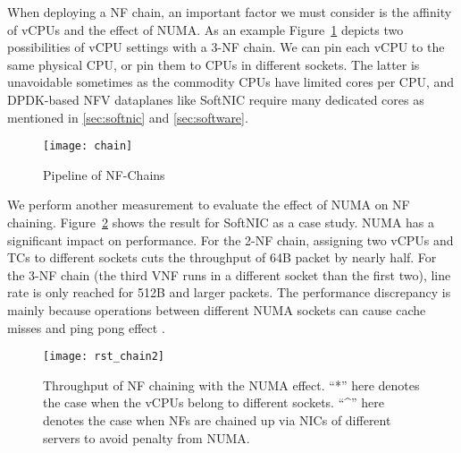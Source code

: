 When deploying a NF chain, an important factor we must consider is the affinity of vCPUs and the effect of NUMA. 
As an example Figure~\ref{fig:top_chain} depicts two possibilities of vCPU settings with a 3-NF chain. We can pin each vCPU to the same physical CPU, or pin them to CPUs in different sockets. The latter is unavoidable sometimes as the commodity CPUs have limited cores per CPU, and DPDK-based NFV dataplanes like SoftNIC require many dedicated cores as mentioned in \cref{sec:softnic} and \cref{sec:software}.
\begin{figure}[ht]
\vspace{-2mm}
    \centering
    \texttt{[image: chain]}
    \caption{Pipeline of NF-Chains}
\vspace{-4mm}
    \label{fig:top_chain}
\end{figure}


We perform another measurement to evaluate the effect of NUMA on NF chaining. 
Figure~\ref{fig:rst_chain2} shows the result for SoftNIC as a case study. 
NUMA has a significant impact on performance. For the 2-NF chain, assigning two vCPUs and TCs to different sockets cuts the throughput of 64B packet by nearly half. For the 3-NF chain (the third VNF runs in a different socket than the first two), line rate is only reached for 512B and larger packets. The performance discrepancy is mainly because operations between different NUMA sockets can cause cache misses and ping pong effect \cite{levinthal2009performance}. 


\begin{figure}[ht]
\centering
    \texttt{[image: rst\_chain2]}
    \caption{Throughput of NF chaining with the NUMA effect. ``*'' here denotes the case when the vCPUs belong to different sockets. ``\string^'' here denotes the case when NFs are chained up via NICs of different servers to avoid penalty from NUMA.}
    \label{fig:rst_chain2}
    \vspace{-1.5mm}
\end{figure}




